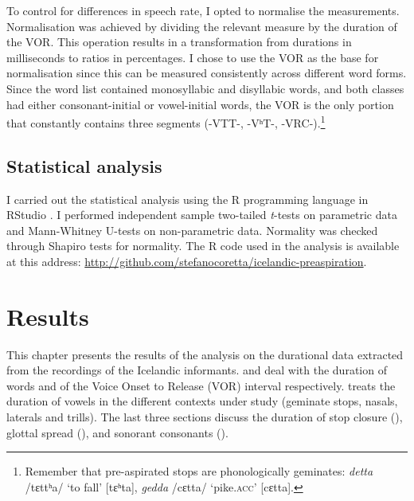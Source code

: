 \documentclass[11pt,a4paper,oneside,openany]{memoir}\usepackage[]{graphicx}\usepackage[]{color}
\begin{document}
To control for differences in speech rate, I opted to normalise the measurements.
Normalisation was achieved by dividing the relevant measure by the duration of the VOR.
This operation results in a transformation from durations in milliseconds to ratios in percentages.
I chose to use the VOR as the base for normalisation since this can be measured consistently across different word forms.
Since the word list contained monosyllabic and disyllabic words, and both classes had either consonant-initial or vowel-initial words, the VOR is the only portion that constantly contains three segments (-VTT-, -VʰT-, -VRC-).\footnote{Remember that pre-aspirated stops are phonologically geminates: \textit{detta} /tɛttʰa/ `to fall' [tɛʰta], \textit{gedda} /cɛtta/ `pike.\textsc{acc}' [cɛtta].}

\section{Statistical analysis}
\label{s:stats}
I carried out the statistical analysis using the R programming language \citep{r-core-team2015} in RStudio \citep{rstudio-team2015}.
I performed independent sample two-tailed \textit{t}-tests on parametric data and Mann-Whitney U-tests on non-parametric data.
Normality was checked through Shapiro tests for normality.
The R code used in the analysis is available at this address: \url{http://github.com/stefanocoretta/icelandic-preaspiration}.













\chapter{Results}
\label{c:results}

This chapter presents the results of the analysis on the durational data extracted from the recordings of the Icelandic informants.
 and  deal with the duration of words and of the Voice Onset to Release (VOR) interval respectively.
 treats the duration of vowels in the different contexts under study (geminate stops, nasals, laterals and trills).
The last three sections discuss the duration of stop closure (), glottal spread (), and sonorant consonants ().
\end{document}
